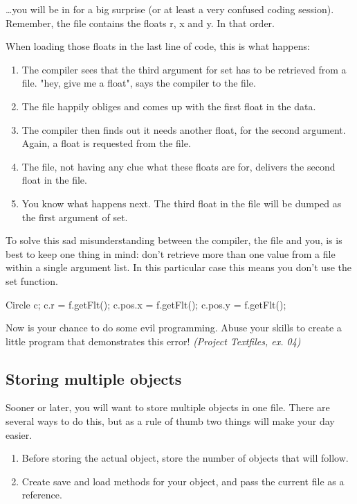 \ldots you will be in for a big surprise (or at least a very confused coding session). Remember, the file contains the floats r, x and y. In that order.

When loading those floats in the last line of code, this is what happens:

\begin{enumerate}
\item The compiler sees that the third argument for set has to be retrieved from a file. "hey, give me a float", says the compiler to the file.
\item The file happily obliges and comes up with the first float in the data.
\item The compiler then finds out it needs another float, for the second argument. Again, a float is requested from the file.
\item The file, not having any clue what these floats are for, delivers the second float in the file.
\item You know what happens next. The third float in the file will be dumped as the first argument of set.
\end{enumerate}

To solve this sad misunderstanding between the compiler, the file and you, is is best to keep one thing in mind: don't retrieve more than one value from a file within a single argument list. In this particular case this means you don't use the set function.

\begin{code}
Circle c;
c.r     = f.getFlt();
c.pos.x = f.getFlt();
c.pos.y = f.getFlt();
\end{code}

\begin{exercise}
Now is your chance to do some evil programming. Abuse your skills to create a little program that demonstrates this error! \textsl{(Project Textfiles, ex. 04)}
\end{exercise}

\subsection{Storing multiple objects}
Sooner or later, you will want to store multiple objects in one file. There are several ways to do this, but as a rule of thumb two things will make your day easier.

\begin{enumerate}
	\item Before storing the actual object, store the number of objects that will follow.
	\item Create save and load methods for your object, and pass the current file as a reference.
\end{enumerate}

